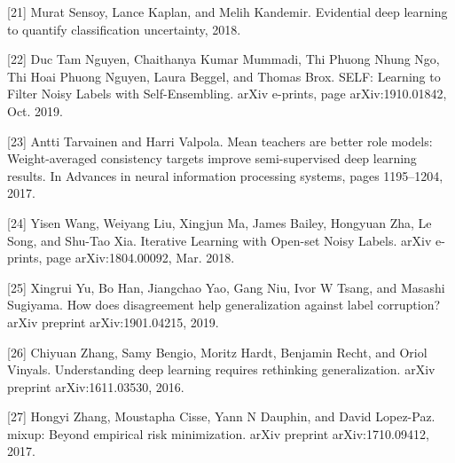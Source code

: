\documentclass[11pt]{article}
\begin{document}
[21] Murat Sensoy, Lance Kaplan, and Melih Kandemir. Evidential
deep learning to quantify classification uncertainty, 2018.

[22] Duc Tam Nguyen, Chaithanya Kumar Mummadi, Thi
Phuong Nhung Ngo, Thi Hoai Phuong Nguyen, Laura
Beggel, and Thomas Brox. SELF: Learning to Filter
Noisy Labels with Self-Ensembling. arXiv e-prints, page
arXiv:1910.01842, Oct. 2019.

[23] Antti Tarvainen and Harri Valpola. Mean teachers are better
role models: Weight-averaged consistency targets improve
semi-supervised deep learning results. In Advances in neural
information processing systems, pages 1195–1204, 2017.

[24] Yisen Wang, Weiyang Liu, Xingjun Ma, James Bailey,
Hongyuan Zha, Le Song, and Shu-Tao Xia. Iterative Learning
with Open-set Noisy Labels. arXiv e-prints, page
arXiv:1804.00092, Mar. 2018.

[25] Xingrui Yu, Bo Han, Jiangchao Yao, Gang Niu, Ivor W
Tsang, and Masashi Sugiyama. How does disagreement
help generalization against label corruption? arXiv preprint
arXiv:1901.04215, 2019.

[26] Chiyuan Zhang, Samy Bengio, Moritz Hardt, Benjamin
Recht, and Oriol Vinyals. Understanding deep learning
requires rethinking generalization. arXiv preprint
arXiv:1611.03530, 2016.

[27] Hongyi Zhang, Moustapha Cisse, Yann N Dauphin, and
David Lopez-Paz. mixup: Beyond empirical risk minimization.
arXiv preprint arXiv:1710.09412, 2017.
\end{document}
